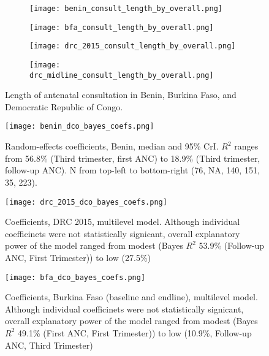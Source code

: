 \documentclass{article}
\begin{document}
\begin{figure}[p]
  \centering
  \begin{subfigure}[b]{0.45\textwidth}
    \texttt{[image: benin\_consult\_length\_by\_overall.png]}
    \subcaption{}
  \end{subfigure}   
  \hfill 
  \begin{subfigure}[b]{0.45\textwidth}
    \texttt{[image: bfa\_consult\_length\_by\_overall.png]}
    \subcaption{}
  \end{subfigure}

  \begin{subfigure}[b]{0.45\textwidth}
    \texttt{[image: drc\_2015\_consult\_length\_by\_overall.png]}
    \subcaption{}
  \end{subfigure}
  \hfill
  \begin{subfigure}[b]{0.45\textwidth}
    \texttt{[image: drc\_midline\_consult\_length\_by\_overall.png]}
    \subcaption{}
  \end{subfigure}   
  \caption{Length of antenatal consultation in Benin, Burkina Faso, and Democratic Republic of Congo.}
  \label{fig:anc length}
\end{figure}


\begin{figure}[p]
  \captionsetup{singlelinecheck=off}
  \centering
  \texttt{[image: benin\_dco\_bayes\_coefs.png]}
  \caption{Random-effects coefficients, Benin, median and 95\% CrI. $R^2$ ranges from 56.8\% (Third trimester, first ANC) to 18.9\% (Third trimester, follow-up ANC). N from top-left to bottom-right (76, NA, 140, 151, 35, 223).}
  \label{fig:benin dco lm}
\end{figure}


\begin{figure}[p]
  \captionsetup{singlelinecheck=off}
  \centering
  \texttt{[image: drc\_2015\_dco\_bayes\_coefs.png]}
  \caption{Coefficients, DRC 2015, multilevel model. Although individual coefficinets were not statistically signicant, overall explanatory power of the model ranged from
    modest (Bayes $R^2$ 53.9\% (Follow-up ANC, First Trimester)) to low (27.5\%)}
  \label{fig:drc 2015 dco lm}
\end{figure} 


\begin{figure}[p]
  \captionsetup{singlelinecheck=off}
  \centering
  \texttt{[image: bfa\_dco\_bayes\_coefs.png]}
  \caption{Coefficients, Burkina Faso (baseline and endline), multilevel model. Although individual coefficinets were not statistically signicant, overall explanatory power of the model ranged from
    modest (Bayes $R^2$ 49.1\% (First ANC, First Trimester)) to low (10.9\%, Follow-up ANC, Third Trimester)}
  \label{fig:bfa dco lm}
\end{figure} 
\end{document}
